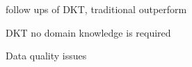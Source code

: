 
follow ups of DKT, traditional outperform

DKT no domain knowledge is required

Data quality issues

